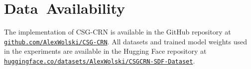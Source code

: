 
\chapter{Data~Availability}
\label{chap:data_availability}

The implementation of CSG-CRN is available in the GitHub repository at \href{https://github.com/AlexWolski/CSG-CRN}{\nolinkurl{github.com/AlexWolski/CSG-CRN}}. All datasets and trained model weights used in the experiments are available in the Hugging Face repository at \href{https://huggingface.co/datasets/AlexWolski/CSGCRN-SDF-Dataset}{\nolinkurl{huggingface.co/datasets/AlexWolski/CSGCRN-SDF-Dataset}}.
